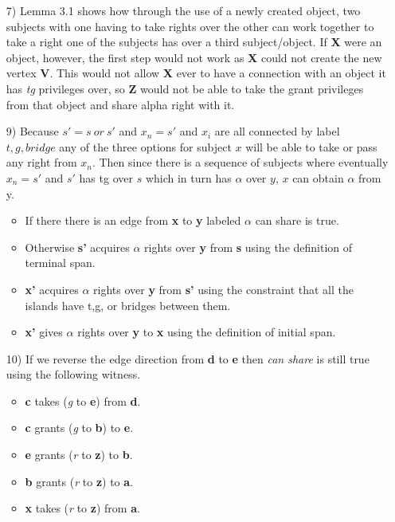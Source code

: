 \documentclass[journal,onecolumn]{IEEEtran}
\begin{document}
\begin{enumerate}
  \item [7)] Lemma 3.1 shows how through the use of a newly created object, two subjects with one having to take rights over the other can work together to take a right one of the subjects has over a third subject/object. If \textbf{X} were an object, however, the first step would not work as \textbf{X} could not create the new vertex \textbf{V}. This would not allow \textbf{X} ever to have a connection with an object it has \textit{tg} privileges over, so \textbf{Z} would not be able to take the grant privileges from that object and share alpha right with it. 
  \item [9)] Because \(s' = s\:or\:s'\) and \(x_n = s'\) and \(x_i\) are all connected by label \(t,g,bridge\) any of the three options for subject \(x\) will be able to take or pass any right from \(x_n\). Then since there is a sequence of subjects where eventually \(x_n = s'\) and \(s'\) has tg over \(s\) which in turn has \(\alpha\) over \(y\), \(x\) can obtain \(\alpha\) from y. 
  \begin{itemize}
    \item If there there is an edge from \textbf{x} to \textbf{y} labeled \(\alpha\) can share is true.
    \item Otherwise \textbf{s'} acquires \(\alpha\) rights over \textbf{y} from \textbf{s} using the definition of terminal span.
    \item \textbf{x'} acquires \(\alpha\) rights over \textbf{y} from \textbf{s'} using the constraint that all the islands have t,g, or bridges between them.
    \item \textbf{x'} gives \(\alpha\) rights over \textbf{y} to \textbf{x} using the definition of initial span.
  \end{itemize}
  \item [10)] If we reverse the edge direction from \textbf{d} to \textbf{e} then \textit{can share} is still true using the following witness.
  \begin{itemize}
    \item \textbf{c} takes (\textit{g} to \textbf{e}) from \textbf{d}.
    \item \textbf{c} grants (\textit{g} to \textbf{b}) to \textbf{e}.
    \item \textbf{e} grants (\textit{r} to \textbf{z}) to \textbf{b}.
    \item \textbf{b} grants (\textit{r} to \textbf{z}) to \textbf{a}.
    \item \textbf{x} takes (\textit{r} to \textbf{z}) from \textbf{a}.

\end{itemize}
\end{enumerate}
\end{document}
